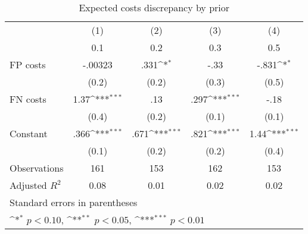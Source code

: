 \begin{table}[htbp]\centering
\def\sym#1{\ifmmode^{#1}\else\(^{#1}\)\fi}
\caption{Expected costs discrepancy by prior}
\begin{tabular}{l*{4}{c}}
\hline\hline
                &\multicolumn{1}{c}{(1)}&\multicolumn{1}{c}{(2)}&\multicolumn{1}{c}{(3)}&\multicolumn{1}{c}{(4)}\\
                &\multicolumn{1}{c}{0.1}&\multicolumn{1}{c}{0.2}&\multicolumn{1}{c}{0.3}&\multicolumn{1}{c}{0.5}\\
\hline
FP costs        &  -.00323         &     .331\sym{*}  &     -.33         &    -.831\sym{*}  \\
                &    (0.2)         &    (0.2)         &    (0.3)         &    (0.5)         \\
FN costs        &     1.37\sym{***}&      .13         &     .297\sym{***}&     -.18         \\
                &    (0.4)         &    (0.2)         &    (0.1)         &    (0.1)         \\
Constant        &     .366\sym{***}&     .671\sym{***}&     .821\sym{***}&     1.44\sym{***}\\
                &    (0.1)         &    (0.2)         &    (0.2)         &    (0.4)         \\
\hline
Observations    &      161         &      153         &      162         &      153         \\
Adjusted \(R^{2}\)&     0.08         &     0.01         &     0.02         &     0.02         \\
\hline\hline
\multicolumn{5}{l}{\footnotesize Standard errors in parentheses}\\
\multicolumn{5}{l}{\footnotesize \sym{*} \(p<0.10\), \sym{**} \(p<0.05\), \sym{***} \(p<0.01\)}\\
\end{tabular}
\end{table}
